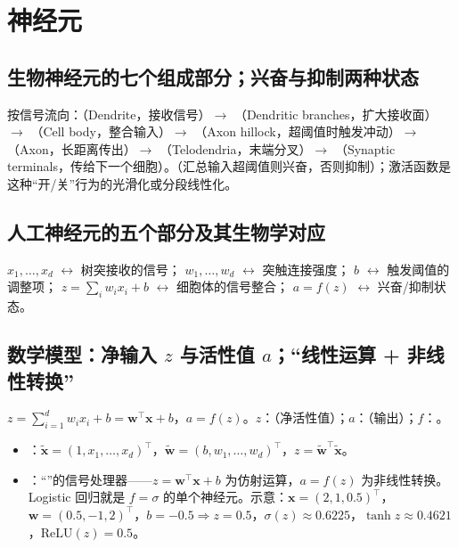 \section{神经元}

\subsection{生物神经元的七个组成部分；兴奋与抑制两种状态}
按信号流向：（Dendrite，接收信号）$\to$ （Dendritic branches，扩大接收面）$\to$ （Cell body，整合输入）$\to$ （Axon hillock，超阈值时触发冲动）$\to$ （Axon，长距离传出）$\to$ （Telodendria，末端分叉）$\to$ （Synaptic terminals，传给下一个细胞）。（汇总输入超阈值则兴奋，否则抑制）；激活函数是这种“开/关”行为的光滑化或分段线性化。

\subsection{人工神经元的五个部分及其生物学对应}
 $x_1,\dots,x_d$ $\leftrightarrow$ 树突接收的信号； $w_1,\dots,w_d$ $\leftrightarrow$ 突触连接强度； $b$ $\leftrightarrow$ 触发阈值的调整项； $z=\sum_iw_ix_i+b$ $\leftrightarrow$ 细胞体的信号整合； $a=f(z)$ $\leftrightarrow$ 兴奋/抑制状态。

\subsection{数学模型：净输入 \texorpdfstring{$z$}{z} 与活性值 \texorpdfstring{$a$}{a}；“线性运算 + 非线性转换”}
$z=\sum_{i=1}^dw_ix_i+b=\bm w^\top\bm x+b$，$a=f(z)$。$z$：（净活性值）；$a$：（输出）；$f$：。
\begin{itemize}
\item {}：$\tilde{\bm x}=(1,x_1,\dots,x_d)^\top$，$\tilde{\bm w}=(b,w_1,\dots,w_d)^\top$，$z=\tilde{\bm w}^\top\tilde{\bm x}$。
\item {}：“”的信号处理器——$z=\bm w^\top\bm x+b$ 为仿射运算，$a=f(z)$ 为非线性转换。Logistic 回归就是 $f=\sigma$ 的单个神经元。示意：$\bm x=(2,1,0.5)^\top$，$\bm w=(0.5,-1,2)^\top$，$b=-0.5\Rightarrow z=0.5$，$\sigma(z)\approx0.6225$，$\tanh z\approx0.4621$，$\mathrm{ReLU}(z)=0.5$。
\end{itemize}

